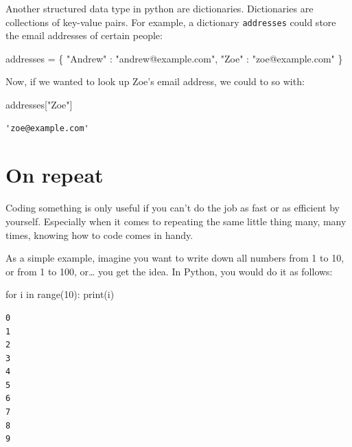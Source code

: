 \documentclass[
  a4paperpaper,
  ,captions=tableheading
]{scrbook}
\newenvironment{Shaded}{\begin{snugshade}}{\end{snugshade}}
\newcommand{\BuiltInTok}[1]{\textcolor[rgb]{0.00,0.23,0.31}{#1}}
\newcommand{\ControlFlowTok}[1]{\textcolor[rgb]{0.00,0.23,0.31}{#1}}
\newcommand{\DecValTok}[1]{\textcolor[rgb]{0.68,0.00,0.00}{#1}}
\newcommand{\KeywordTok}[1]{\textcolor[rgb]{0.00,0.23,0.31}{#1}}
\newcommand{\NormalTok}[1]{\textcolor[rgb]{0.00,0.23,0.31}{#1}}
\newcommand{\OperatorTok}[1]{\textcolor[rgb]{0.37,0.37,0.37}{#1}}
\newcommand{\StringTok}[1]{\textcolor[rgb]{0.13,0.47,0.30}{#1}}
\begin{document}
Another structured data type in python are dictionaries. Dictionaries
are collections of key-value pairs. For example, a dictionary
\texttt{addresses} could store the email addresses of certain people:

\begin{Shaded}
\begin{Highlighting}[]
\NormalTok{addresses }\OperatorTok{=}\NormalTok{ \{}
    \StringTok{"Andrew"}\NormalTok{ : }\StringTok{"andrew@example.com"}\NormalTok{,}
    \StringTok{"Zoe"}\NormalTok{ : }\StringTok{"zoe@example.com"}
\NormalTok{\}}
\end{Highlighting}
\end{Shaded}

Now, if we wanted to look up Zoe's email address, we could to so with:

\begin{Shaded}
\begin{Highlighting}[]
\NormalTok{addresses[}\StringTok{"Zoe"}\NormalTok{]}
\end{Highlighting}
\end{Shaded}

\begin{verbatim}
'zoe@example.com'
\end{verbatim}

\hypertarget{on-repeat}{%
\section{On repeat}\label{on-repeat}}

Coding something is only useful if you can't do the job as fast or as
efficient by yourself. Especially when it comes to repeating the same
little thing many, many times, knowing how to code comes in handy.

As a simple example, imagine you want to write down all numbers from 1
to 10, or from 1 to 100, or\ldots{} you get the idea. In Python, you
would do it as follows:

\begin{Shaded}
\begin{Highlighting}[]
\ControlFlowTok{for}\NormalTok{ i }\KeywordTok{in} \BuiltInTok{range}\NormalTok{(}\DecValTok{10}\NormalTok{):}
    \BuiltInTok{print}\NormalTok{(i)}
\end{Highlighting}
\end{Shaded}

\begin{verbatim}
0
1
2
3
4
5
6
7
8
9
\end{verbatim}
\end{document}
